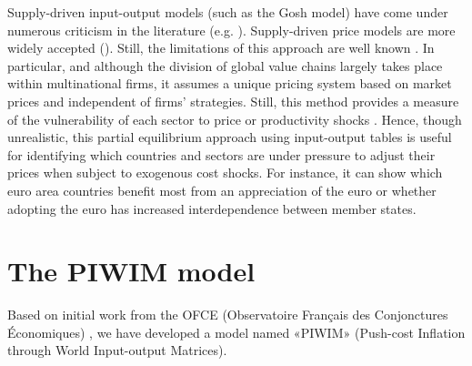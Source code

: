 \documentclass[12pt,a4paper]{paper}
\begin{document}
Supply-driven input-output models (such as the Gosh model) have come under numerous criticism in the literature (e.g. \cite{Oosterhaven1988}). Supply-driven price models are more widely accepted (\cite{Dietzenbacher1997}). Still, the limitations of this approach are well known \citep{Folloni1994}. In particular, and although the division of global value chains largely takes place within multinational firms, it assumes a unique pricing system based on market prices and independent of firms' strategies. Still, this method provides a measure of the vulnerability of each sector to price or productivity shocks \citep{Acemoglu2012,Carvalho2014}. 
Hence, though unrealistic, this partial equilibrium approach using input-output tables is useful for identifying which countries and sectors are under pressure to adjust their prices when subject to exogenous cost shocks. For instance, it can show which euro area countries benefit most from an appreciation of the euro or whether adopting the euro has increased interdependence between member states.


\section{The PIWIM model }
\label{sec:metho}

Based on initial work from the OFCE (Observatoire Français des Conjonctures Économiques) \cite{Cochard2016}, we have developed a model named «PIWIM» (Push-cost Inflation through World Input-output Matrices). 
\end{document}
